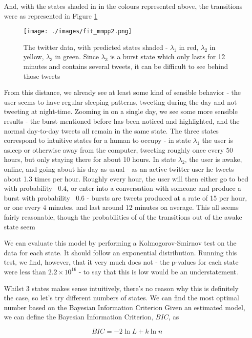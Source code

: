 And, with the states shaded in in the colours represented above, the transitions were as represented in Figure \ref{fit_mmpp2}

\begin{figure}[h!]
\texttt{[image: ./images/fit\_mmpp2.png]}
\caption{The twitter data, with predicted states shaded - $\lambda_1$ in red, $\lambda_2$ in yellow, $\lambda_3$ in green. Since $\lambda_3$ is a burst state which only lasts for 12 minutes and contains several tweets, it can be difficult to see behind those tweets}
\label{fit_mmpp2}
\end{figure}

From this distance, we already see at least some kind of sensible behavior - the user seems to have regular sleeping patterns, tweeting during the day and not tweeting at night-time. Zooming in on a single day, we see some more sensible results - the burst mentioned before has been noticed and highlighted, and the normal day-to-day tweets all remain in the same state. The three states correspond to intuitive states for a human to occupy - in state $\lambda_1$ the user is asleep or otherwise away from the computer, tweeting roughly once every 50 hours, but only staying there for about 10 hours. In state $\lambda_2$, the user is awake, online, and going about his day as usual - as an active twitter user he tweets about 1.3 times per hour. Roughly every hour, the user will then either go to bed with probability ~$0.4$, or enter into a conversation with someone and produce a burst with probability ~$0.6$ - bursts are tweets produced at a rate of 15 per hour, or one every 4 minutes, and last around 12 minutes on average. This all seems fairly reasonable, though the probabilities of of the transitions out of the awake state seem

We can evaluate this model by performing a Kolmogorov-Smirnov test on the data for each state. It should follow an exponential distribution. Running this test, we find, however, that it very much does not - the p-values for each state were less than $2.2 \times 10^{16}$ - to say that this is low would be an understatement.

Whilst 3 states makes sense intuitively, there's no reason why this is definitely the case, so let's try different numbers of states. We can find the most optimal number based on the Bayesian Information Criterion %
Given an estimated model, we can define the Bayesian Information Criterion, $BIC$, as

$$
BIC = -2 \ln L + k \ln n
$$

